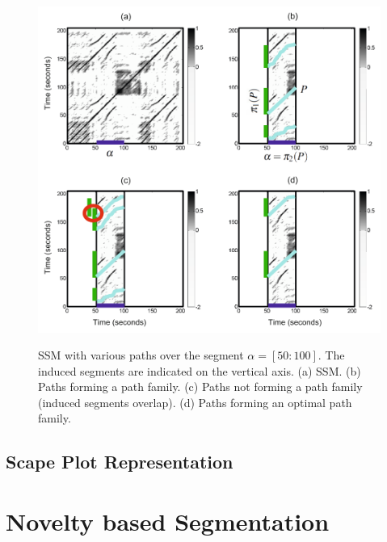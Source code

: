 \documentclass[a4paper, 9pt, twocolumn]{extarticle}
\begin{document}
\begin{figure}[h]
  \includegraphics[width=\linewidth]{images/pathFamilies.png}
  \label{fig:pathFamilies}
	\begin{center}
		\caption{SSM with various paths over the segment $\alpha=[50:100]$. The induced segments are indicated on the vertical axis. (a) SSM. (b) Paths forming a path family. (c) Paths not forming a path family (induced segments overlap). (d) Paths forming an optimal path family.}
	\end{center}
\end{figure}

\subsection{Scape Plot Representation}
\label{subsection:scapePlot}


\section{Novelty based Segmentation}
\label{section:novelty}


\end{document}
